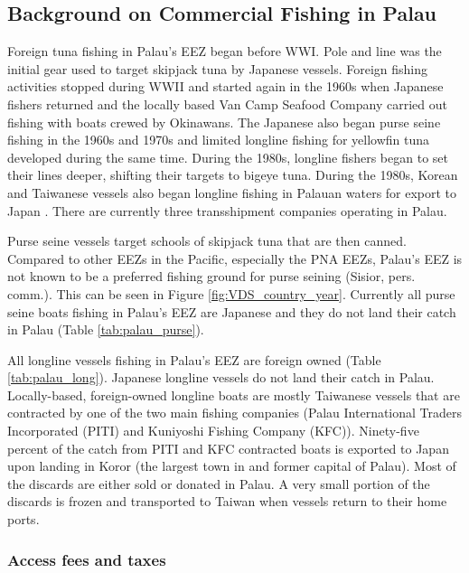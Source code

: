 \documentclass[9pttwoside,lineno]{pnas-new}
\begin{document}
\subsection{Background on Commercial Fishing in Palau}\label{Palau_back}

Foreign tuna fishing in Palau’s EEZ began before WWI. Pole and line was the initial gear used to target skipjack tuna by Japanese vessels. Foreign fishing activities stopped during WWII and started again in the 1960s when Japanese fishers returned and the locally based Van Camp Seafood Company carried out fishing with boats crewed by Okinawans. The Japanese also began purse seine fishing in the 1960s and 1970s and limited longline fishing for yellowfin tuna developed during the same time. During the 1980s, longline fishers began to set their lines deeper, shifting their targets to bigeye tuna. During the 1980s, Korean and Taiwanese vessels also began longline fishing in Palauan waters for export to Japan \citep{chapman2000development}. There are currently three transshipment companies operating in Palau.

Purse seine vessels target schools of skipjack tuna that are then canned. Compared to other EEZs in the Pacific, especially the PNA EEZs, Palau’s EEZ is not known to be a preferred fishing ground for purse seining (Sisior, pers. comm.). This can be seen in Figure \ref{fig:VDS_country_year}. Currently all purse seine boats fishing in Palau’s EEZ are Japanese and they do not land their catch in Palau (Table \ref{tab:palau_purse}). 



All longline vessels fishing in Palau’s EEZ are foreign owned (Table \ref{tab:palau_long}). Japanese longline vessels do not land their catch in Palau. Locally-based, foreign-owned longline boats are mostly Taiwanese vessels that are contracted by one of the two main fishing companies (Palau International Traders Incorporated (PITI) and Kuniyoshi Fishing Company (KFC)). Ninety-five percent of the catch from PITI and KFC contracted boats is exported to Japan upon landing in Koror (the largest town in and former capital of Palau). Most of the discards are either sold or donated in Palau. A very small portion of the discards is frozen and transported to Taiwan when vessels return to their home ports.




\subsubsection{Access fees and taxes}
\end{document}
